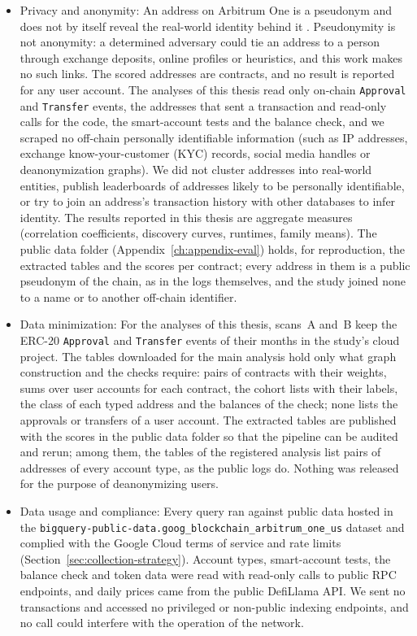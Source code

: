 \begin{itemize}
\item{}\label{sub:privacy-anonymity}
  Privacy and anonymity: An address on Arbitrum One is a pseudonym and does not by itself reveal the real-world identity behind it \parencite{packin2024credit}. Pseudonymity is not anonymity: a determined adversary could tie an address to a person through exchange deposits, online profiles or heuristics, and this work makes no such links. The scored addresses are contracts, and no result is reported for any user account. The analyses of this thesis read only on-chain \texttt{Approval} and \texttt{Transfer} events, the addresses that sent a transaction and read-only calls for the code, the smart-account tests and the balance check, and we scraped no off-chain personally identifiable information (such as IP addresses, exchange know-your-customer (KYC) records, social media handles or deanonymization graphs). We did not cluster addresses into real-world entities, publish leaderboards of addresses likely to be personally identifiable, or try to join an address's transaction history with other databases to infer identity. The results reported in this thesis are aggregate measures (correlation coefficients, discovery curves, runtimes, family means). The public data folder (Appendix~\ref{ch:appendix-eval}) holds, for reproduction, the extracted tables and the scores per contract; every address in them is a public pseudonym of the chain, as in the logs themselves, and the study joined none to a name or to another off-chain identifier.

\item{}\label{sub:data-minimization}
  Data minimization: For the analyses of this thesis, scans~A and~B keep the ERC-20 \texttt{Approval} and \texttt{Transfer} events of their months in the study's cloud project. The tables downloaded for the main analysis hold only what graph construction and the checks require: pairs of contracts with their weights, sums over user accounts for each contract, the cohort lists with their labels, the class of each typed address and the balances of the check; none lists the approvals or transfers of a user account. The extracted tables are published with the scores in the public data folder so that the pipeline can be audited and rerun; among them, the tables of the registered analysis list pairs of addresses of every account type, as the public logs do. Nothing was released for the purpose of deanonymizing users.


\item{}\label{sub:data-usage-compliance}
  Data usage and compliance: Every query ran against public data hosted in the \texttt{bigquery-public-data.goog\_blockchain\_arbitrum\_one\_us} dataset and complied with the Google Cloud terms of service and rate limits (Section~\ref{sec:collection-strategy}). Account types, smart-account tests, the balance check and token data were read with read-only calls to public RPC endpoints, and daily prices came from the public DefiLlama API. We sent no transactions and accessed no privileged or non-public indexing endpoints, and no call could interfere with the operation of the network.



\end{itemize}
